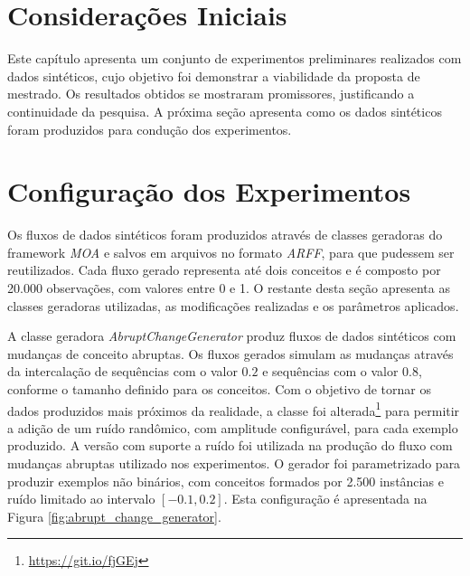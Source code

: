 \documentclass[qual, classic, a4paper]{ufbathesis}
\begin{document}
 \label{experimentos_iniciais}
\section{Considerações Iniciais}

Este capítulo apresenta um conjunto de experimentos preliminares realizados com dados sintéticos, cujo objetivo foi demonstrar a viabilidade da proposta de mestrado.
%
Os resultados obtidos se mostraram promissores, justificando a continuidade da pesquisa.
%
A próxima seção apresenta como os dados sintéticos foram produzidos para condução dos experimentos.

\section{Configuração dos Experimentos}
\label{sec:configuracao_experimentos}

Os fluxos de dados sintéticos foram produzidos através de classes geradoras do framework \textit{MOA} e salvos em arquivos no formato \textit{ARFF}, para que pudessem ser reutilizados.
Cada fluxo gerado representa até dois conceitos e é composto por 20.000 observações, com valores entre 0 e 1.
O restante desta seção apresenta as classes geradoras utilizadas, as modificações realizadas e os parâmetros aplicados.

A classe geradora \textit{AbruptChangeGenerator} produz fluxos de dados sintéticos com mudanças de conceito abruptas.
Os fluxos gerados simulam as mudanças através da intercalação de sequências com o valor $0.2$ e sequências com o valor $0.8$, conforme o tamanho definido para os conceitos.
Com o objetivo de tornar os dados produzidos mais próximos da realidade, a classe foi alterada\footnote{\url{https://git.io/fjGEj}} para permitir a adição de um ruído randômico, com amplitude configurável, para cada exemplo produzido.
A versão com suporte a ruído foi utilizada na produção do fluxo com mudanças abruptas utilizado nos experimentos.
O gerador foi parametrizado para produzir exemplos não binários, com conceitos formados por 2.500 instâncias e ruído limitado ao intervalo $[-0.1, 0.2]$.
Esta configuração é apresentada na Figura \ref{fig:abrupt_change_generator}.
\end{document}
